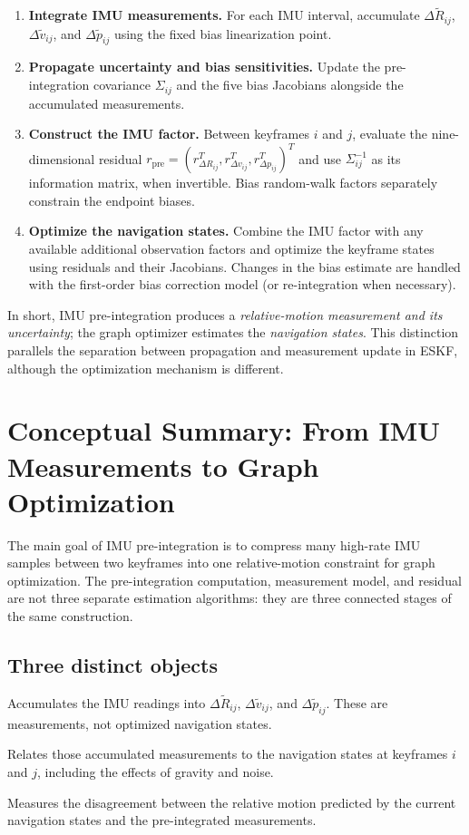 \documentclass[11pt,a4paper]{article}
\begin{document}
\begin{enumerate}
  \item \textbf{Integrate IMU measurements.} For each IMU interval,
  accumulate $\Delta\tilde R_{ij}$, $\Delta\tilde v_{ij}$, and
  $\Delta\tilde p_{ij}$ using the fixed bias linearization point.
  \item \textbf{Propagate uncertainty and bias sensitivities.}
  Update the pre-integration covariance $\Sigma_{ij}$ and the five
  bias Jacobians alongside the accumulated measurements.
  \item \textbf{Construct the IMU factor.} Between keyframes $i$ and $j$,
  evaluate the nine-dimensional residual
  $r_{\mathrm{pre}}=(r_{\Delta R_{ij}}^T,
  r_{\Delta v_{ij}}^T,r_{\Delta p_{ij}}^T)^T$ and use
  $\Sigma_{ij}^{-1}$ as its information matrix, when invertible.
  Bias random-walk factors separately constrain the endpoint biases.
  \item \textbf{Optimize the navigation states.} Combine the IMU
  factor with any available additional observation factors and
  optimize the keyframe states using residuals and their Jacobians.
  Changes in the bias estimate are handled with the first-order
  bias correction model (or re-integration when necessary).
\end{enumerate}

In short, IMU pre-integration produces a \emph{relative-motion
measurement and its uncertainty}; the graph optimizer estimates the
\emph{navigation states}. This distinction parallels the separation
between propagation and measurement update in ESKF, although the
optimization mechanism is different.


\section{Conceptual Summary: From IMU Measurements to Graph Optimization}
\label{sec:conceptual_summary}
The main goal of IMU pre-integration is to compress many high-rate IMU
samples between two keyframes into one relative-motion constraint for
graph optimization. The pre-integration computation, measurement model,
and residual are not three separate estimation algorithms: they are
three connected stages of the same construction.

\subsection{Three distinct objects}
\begin{description}[leftmargin=2.6cm,style=nextline]
\item[Pre-integration computation]
Accumulates the IMU readings into
$\Delta\tilde R_{ij}$, $\Delta\tilde v_{ij}$, and $\Delta\tilde p_{ij}$.
These are measurements, not optimized navigation states.
\item[Measurement model]
Relates those accumulated measurements to the navigation states at
keyframes $i$ and $j$, including the effects of gravity and noise.
\item[Residual]
Measures the disagreement between the relative motion predicted by
the current navigation states and the pre-integrated measurements.
\end{description}
\end{document}
